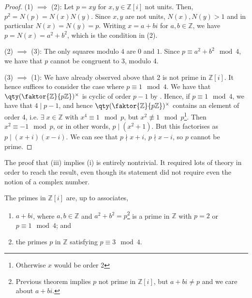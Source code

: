 \begin{proof}
	(1) $\implies$ (2): Let $p = xy$ for $x, y \in \mathbb Z[i]$ not units.
	Then, $p^2 = N(p) = N(x)N(y)$.
	Since $x, y$ are not units, $N(x), N(y) > 1$ and in particular $N(x) = N(y) = p$.
	Writing $x = a+bi$ for $a, b \in \mathbb Z$, we have $p = N(x) = a^2 + b^2$, which is the condition in (2).

	(2) $\implies$ (3): The only squares modulo $4$ are $0$ and $1$.
	Since $p \equiv a^2 + b^2 \mod 4$, we have that $p$ cannot be congruent to 3, modulo 4.

	(3) $\implies$ (1): We have already observed above that 2 is not prime in $\mathbb{Z}[i]$.
	It hence suffices to consider the case where $p \equiv 1 \mod 4$.
	We have that $\qty(\faktor{\mathbb Z}{p\mathbb Z})^\times$ is cyclic of order $p-1$ by .
	Hence, if $p \equiv 1 \mod 4$, we have that $4 \mid p-1$, and hence $\qty(\faktor{\mathbb Z}{p\mathbb Z})^\times$ contains an element of order 4, i.e. $\exists \; x \in \mathbb Z$ with $x^4 \equiv 1 \mod p$, but $x^2 \not\equiv 1 \mod p$\footnote{Otherwise $x$ would be order 2}.
	Then $x^2 \equiv -1 \mod p$, or in other words, $p \mid (x^2 + 1)$.
	But this factorises as $p \mid (x+i)(x-i)$.
	We can see that $p \nmid x+i$, $p \nmid x-i$, so $p$ cannot be prime.
\end{proof}

\begin{remark}
	The proof that (iii) implies (i) is entirely nontrivial.
	It required lots of theory in order to reach the result, even though its statement did not require even the notion of a complex number.
\end{remark}

\begin{theorem} \label{thm:12.2}
	The primes in $\mathbb Z[i]$ are, up to associates,
	\begin{enumerate}
		\item $a + bi$, where $a, b \in \mathbb Z$ and $a^2 + b^2 = p$\footnote{Previous theorem implies $p$ not prime in $\mathbb{Z}[i]$, but $a + bi \neq p$ and we care about $a + bi$.} is a prime in $\mathbb Z$ with $p = 2$ or $p \equiv 1 \mod 4$; and
		\item the primes $p$ in $\mathbb Z$ satisfying $p \equiv 3 \mod 4$.
	\end{enumerate}
\end{theorem}

